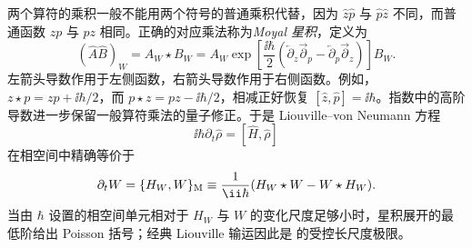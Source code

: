 两个算符的乘积一般不能用两个符号的普通乘积代替，因为 $\hat z\hat p$ 与 $\hat p\hat z$ 不同，而普通函数 $zp$ 与 $pz$ 相同。正确的对应乘法称为\emph{Moyal 星积}，定义为
\begin{equation}
{
(\hat A\hat B)_W=A_W\star B_W
=A_W\exp\!\left[
\frac{\ii\hbar}{2}
\left(
\overleftarrow\partial_z\overrightarrow\partial_p
-\overleftarrow\partial_p\overrightarrow\partial_z
\right)\right]B_W.}
\label{eq:weyl_star_product_derived}
\end{equation}
左箭头导数作用于左侧函数，右箭头导数作用于右侧函数。例如，$z\star p=zp+\ii\hbar/2$，而 $p\star z=pz-\ii\hbar/2$，相减正好恢复 $[\hat z,\hat p]=\ii\hbar$。指数中的高阶导数进一步保留一般算符乘法的量子修正。于是 Liouville--von Neumann 方程
\[
\ii\hbar\partial_t\hat\rho=[\hat H,\hat\rho]
\]
在相空间中精确等价于
\begin{equation}
{
\partial_tW=\{H_W,W\}_{\rm M}
\equiv\frac{1}{\ii\hbar}(H_W\star W-W\star H_W).}
\label{eq:moyal_general}
\end{equation}
当由 $\hbar$ 设置的相空间单元相对于 $H_W$ 与 $W$ 的变化尺度足够小时，星积展开的最低阶给出 Poisson 括号；经典 Liouville 输运因此是 的受控长尺度极限。

